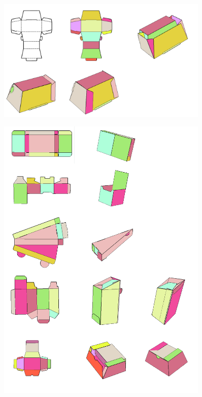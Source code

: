\documentclass[submission]{gmp2018}
\begin{document}
\begin{figure}
	\centering
	\includegraphics[width=0.9\textwidth]{images/result.jpg}
	\caption{}
	\label{fig:result}
\end{figure}

\begin{figure}
	\centering
	\includegraphics[width=0.9\textwidth]{images/more.jpg}
	\caption{}
	\label{fig:more}
\end{figure}
\end{document}
